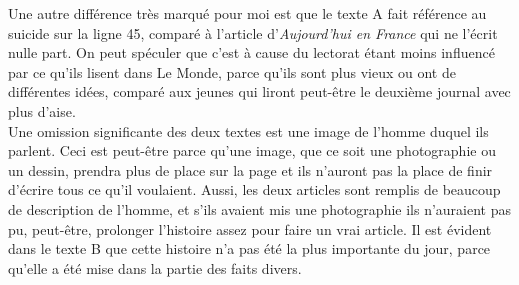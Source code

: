 \documentclass[12pt,a4paper]{article}
\begin{document}
Une autre différence très marqué pour moi est que le texte A fait
référence au suicide sur la ligne 45, comparé à l'article
d'\textit{Aujourd'hui en France} qui ne l'écrit nulle part. On peut
spéculer que c'est à cause du lectorat étant moins influencé par ce
qu'ils lisent dans Le Monde, parce qu'ils sont plus vieux ou ont de
différentes idées, comparé aux jeunes qui liront peut-être le deuxième
journal avec plus d'aise.\\

Une omission significante des deux textes est une image de l'homme
duquel ils parlent. Ceci est peut-être parce qu'une image, que ce soit
une photographie ou un dessin, prendra plus de place sur la page et
ils n'auront pas la place de finir d'écrire tous ce qu'il voulaient.
Aussi, les deux articles sont remplis de beaucoup de description de
l'homme, et s'ils avaient mis une photographie ils n'auraient pas pu,
peut-être, prolonger l'histoire assez pour faire un vrai article. Il
est évident dans le texte B que cette histoire n'a pas été la plus
importante du jour, parce qu'elle a été mise dans la partie des faits
divers.
\end{document}
